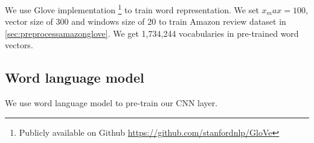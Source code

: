 We use Glove implementation \footnote{Publicly available on Github \url{https://github.com/stanfordnlp/GloVe}} to train word representation. We set $x_max = 100$, vector size of 300 and windows size of 20 to train Amazon review dataset in \ref{sec:preprocessamazonglove}. We get 1,734,244 vocabularies in pre-trained word vectors. 

\subsection{Word language model}
We use word language model to pre-train our CNN layer. 





